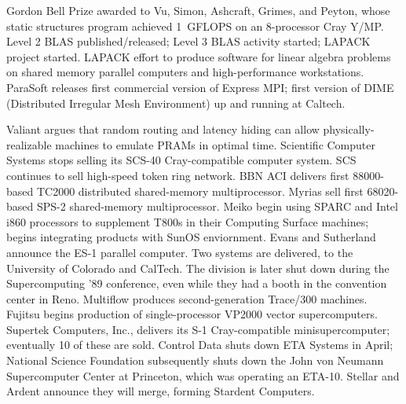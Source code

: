 	{Gordon Bell Prize awarded to Vu, Simon, Ashcraft, Grimes, and Peyton,
	whose static structures program achieved
	1~GFLOPS on an 8-processor Cray Y/MP.}
        {Level 2 BLAS published/released;
	Level 3 BLAS activity started;
	LAPACK project started. LAPACK effort to produce software for
	linear algebra problems
	on shared memory parallel computers and high-performance workstations.}
	{ParaSoft releases first commercial version of Express MPI;
	first version of DIME (Distributed Irregular Mesh Environment)
	up and running at Caltech.}

	{Valiant argues that random routing and latency hiding
	can allow physically-realizable machines
	to emulate PRAMs in optimal time.}
	{Scientific Computer Systems stops selling its SCS-40
	Cray-compatible computer system.
	SCS continues to sell high-speed token ring network.}
	{BBN ACI delivers first 88000-based TC2000
	distributed shared-memory multiprocessor.}
	{Myrias sell first 68020-based SPS-2
	shared-memory multiprocessor.}
	{Meiko begin using SPARC and Intel i860 processors
	to supplement T800s in their Computing Surface machines;
	begins integrating products with SunOS enviornment.}
	{Evans and Sutherland announce the ES-1 parallel computer.
	Two systems are delivered, to the University of Colorado and
	CalTech.  The division is later shut down
	during the Supercomputing '89 conference, even while
	they had a booth in the convention center in Reno.}
	{Multiflow produces second-generation Trace/300 machines.}
	{Fujitsu begins production of single-processor VP2000
	vector supercomputers.}
	{Supertek Computers, Inc., delivers its S-1 Cray-compatible
	minisupercomputer; eventually 10 of these are sold.}
	{Control Data shuts down ETA Systems in April;
	National Science Foundation subsequently shuts down
	the John von Neumann Supercomputer Center at Princeton,
	which was operating an ETA-10.}
	{Stellar and Ardent announce they will merge, forming 
	Stardent Computers.}
